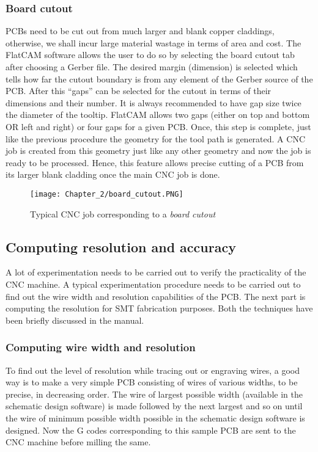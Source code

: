 \subsubsection*{Board cutout} \label{outline_cut}

PCBs need to be cut out from much larger and blank copper claddings, otherwise, we shall incur large material wastage in terms of area and cost. The FlatCAM software allows the user to do so by selecting the board cutout tab after choosing a Gerber file. The desired margin (dimension) is selected which tells how far the cutout boundary is from any element of the Gerber source of the PCB. After this “gaps” can be selected for the cutout in terms of their dimensions and their number. It is always recommended to have gap size twice the diameter of the tooltip. FlatCAM allows two gaps (either on top and bottom OR left and right) or four gaps for a given PCB. Once, this step is complete, just like the previous procedure the geometry for the tool path is generated. A CNC job is created from this geometry just like any other geometry and now the job is ready to be processed.  Hence, this feature allows precise cutting of a PCB from its larger blank cladding once the main CNC job is done.

\begin{figure}[h]
 \centering
 \texttt{[image: Chapter\_2/board\_cutout.PNG]}
 \caption{Typical CNC job corresponding to a \textit{board cutout}}
 \label{fig:board_cutout}
\end{figure}


\subsection{Computing resolution and accuracy} \label{res_and_acc}
A lot of experimentation needs to be carried out to verify the practicality of the CNC machine. A typical experimentation procedure needs to be carried out to find out the wire width and resolution capabilities of the PCB. The next part is computing the resolution for SMT fabrication purposes. Both the techniques have been briefly discussed in the manual.

\subsubsection*{Computing wire width and resolution}
To find out the level of resolution while tracing out or engraving wires, a good way is to make a very simple PCB consisting of wires of various widths, to be precise, in decreasing order. The wire of largest possible width (available in the schematic design software) is made followed by the next largest and so on until the wire of minimum possible width possible in the schematic design software is designed. Now the G codes corresponding to this sample PCB are sent to the CNC machine before milling the same. \par

